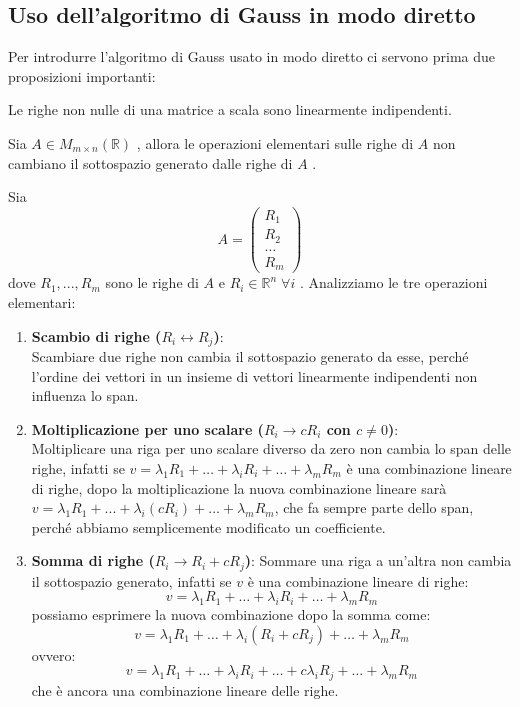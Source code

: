 \documentclass[
  a4paper,
]{article}
\begin{document}
\hypertarget{uso-dellalgoritmo-di-gauss-in-modo-diretto}{%
\subsection{Uso dell'algoritmo di Gauss in modo
diretto}\label{uso-dellalgoritmo-di-gauss-in-modo-diretto}}

Per introdurre l'algoritmo di Gauss usato in modo diretto ci servono
prima due proposizioni importanti:

\begin{propositionbox}
Le righe non nulle di una matrice a scala sono linearmente indipendenti.
\end{propositionbox}

\begin{propositionbox}
Sia \(A \in M_{m \times n}(\mathbb{R})\) , allora le operazioni
elementari sulle righe di \(A\) non cambiano il sottospazio generato
dalle righe di \(A\) .
\end{propositionbox}

\begin{proofbox}
Sia \[
A = 
\begin{pmatrix}
R_1 \\
R_2 \\
\dots \\
R_m
\end{pmatrix}
\] dove \(R_1, ..., R_m\) sono le righe di \(A\) e
\(R_i \in \mathbb{R}^n \;\forall i\) . Analizziamo le tre operazioni
elementari:

\begin{enumerate}
\def\labelenumi{\arabic{enumi}.}
\item
  \textbf{Scambio di righe (\(R_i \leftrightarrow R_j\))}:\\
  Scambiare due righe non cambia il sottospazio generato da esse, perché
  l'ordine dei vettori in un insieme di vettori linearmente indipendenti
  non influenza lo span.
\item
  \textbf{Moltiplicazione per uno scalare (\(R_i \to cR_i\) con
  \(c \neq 0\))}:\\
  Moltiplicare una riga per uno scalare diverso da zero non cambia lo
  span delle righe, infatti se
  \(v = \lambda_1 R_1 + \dots + \lambda_i R_i + \dots + \lambda_m R_m\)
  è una combinazione lineare di righe, dopo la moltiplicazione la nuova
  combinazione lineare sarà
  \(v = \lambda_1 R_1 + ... + \lambda_i(cR_i) + \dots + \lambda_m R_m\),
  che fa sempre parte dello span, perché abbiamo semplicemente
  modificato un coefficiente.
\item
  \textbf{Somma di righe (\(R_i \to R_i + cR_j\))}: Sommare una riga a
  un'altra non cambia il sottospazio generato, infatti se \(v\) è una
  combinazione lineare di righe: \[ 
  v = \lambda_1 R_1 + \dots + \lambda_i R_i + \dots + \lambda_m R_m
  \] possiamo esprimere la nuova combinazione dopo la somma come: \[
  v =\lambda_1 R_1 + \dots + \lambda_i (R_i + cR_j) + \dots + \lambda_m R_m 
  \] ovvero: \[
  v =\lambda_1 R_1 + \dots + \lambda_i R_i + \dots + c \lambda_iR_j + \dots + \lambda_m R_m 
  \] che è ancora una combinazione lineare delle righe.
\end{enumerate}
\end{proofbox}
\end{document}
